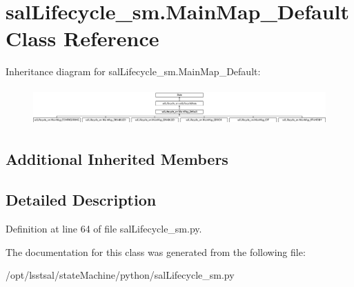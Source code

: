 \hypertarget{classsal_lifecycle__sm_1_1_main_map___default}{\section{sal\-Lifecycle\-\_\-sm.\-Main\-Map\-\_\-\-Default Class Reference}
\label{classsal_lifecycle__sm_1_1_main_map___default}
}
Inheritance diagram for sal\-Lifecycle\-\_\-sm.\-Main\-Map\-\_\-\-Default\-:\begin{figure}[H]
\begin{center}
\leavevmode
\includegraphics[height=1.441441cm]{classsal_lifecycle__sm_1_1_main_map___default}
\end{center}
\end{figure}
\subsection*{Additional Inherited Members}


\subsection{Detailed Description}


Definition at line 64 of file sal\-Lifecycle\-\_\-sm.\-py.



The documentation for this class was generated from the following file\-:\begin{DoxyCompactItemize}
\item 
/opt/lsstsal/state\-Machine/python/sal\-Lifecycle\-\_\-sm.\-py\end{DoxyCompactItemize}
